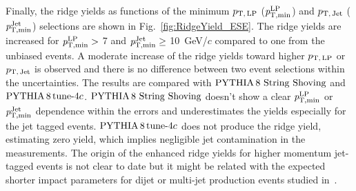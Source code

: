 Finally, the ridge yields as functions of the minimum $p_\mathrm{T,\,LP}$ ($\it{p}^{\rm{LP}}_{\rm{T,min}}$) and $p_\mathrm{T,\,Jet}$ ($\it{p}^{\rm{Jet}}_{\rm{T,min}}$) selections are shown in Fig.~\ref{fig:RidgeYield_ESE}. The ridge yields are increased for $\it{p}^{\rm{LP}}_{\rm{T,min}} >$ 7 and $\it{p}^{\rm{Jet}}_{\rm{T,min}} \ge$ 10~GeV/$c$ compared to one from the unbiased events. A moderate increase of the ridge yields toward higher $p_\mathrm{T,\,LP}$ or $p_\mathrm{T,\,Jet}$ is observed and there is no difference between two event selections within the uncertainties.
The results are compared with ${\mathrm{PYTHIA}\,8~\mathrm{String}~}\mathrm{Shoving}$ and $\mathrm{PYTHIA}\,8\,\mathrm{tune}{\text -}4c$. ${\mathrm{PYTHIA}\,8~\mathrm{String}~}\mathrm{Shoving}$ doesn't show a clear $\it{p}^{\rm{LP}}_{\rm{T,min}}$ or $\it{p}^{\rm{Jet}}_{\rm{T,min}}$ dependence within the errors and underestimates the yields especially for the jet tagged events. $\mathrm{PYTHIA}\,8\,\mathrm{tune}{\text -}4c$ does not produce the ridge yield, estimating zero yield, which implies negligible jet contamination in the measurements.
The origin of the enhanced ridge yields for higher momentum jet-tagged events is not clear to date but it might be related with the expected shorter impact parameters for dijet or multi-jet production events studied in~\cite{Frankfurt:2010ea}.
